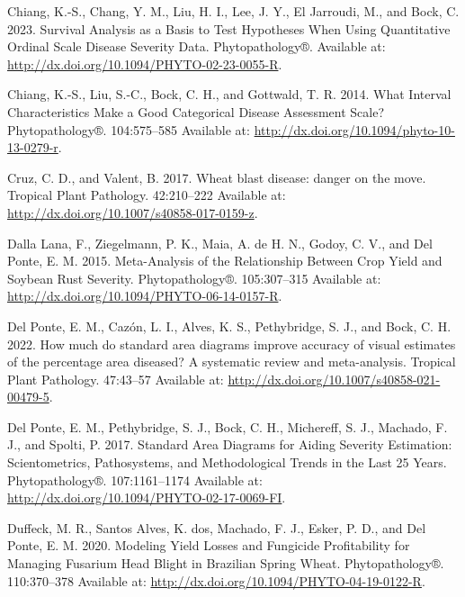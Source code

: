\documentclass[
  letterpaper,
]{book}
\newlength{\cslhangindent}
\newlength{\cslentryspacingunit} %
\newenvironment{CSLReferences}[2] %
 {%
  \setlength{\parindent}{0pt}
  \ifodd #1
  \let\oldpar\par
  \def\par{\hangindent=\cslhangindent\oldpar}
  \fi
  \setlength{\parskip}{#2\cslentryspacingunit}
 }%
 {}
\begin{document}
\begin{CSLReferences}{0}{0}
\leavevmode{}%
Chiang, K.-S., Chang, Y. M., Liu, H. I., Lee, J. Y., El Jarroudi, M.,
and Bock, C. 2023. Survival Analysis as a Basis to Test Hypotheses When
Using Quantitative Ordinal Scale Disease Severity Data. Phytopathology®.
Available at: \url{http://dx.doi.org/10.1094/PHYTO-02-23-0055-R}.

\leavevmode{}%
Chiang, K.-S., Liu, S.-C., Bock, C. H., and Gottwald, T. R. 2014. What
Interval Characteristics Make a Good Categorical Disease Assessment
Scale? Phytopathology®. 104:575--585 Available at:
\url{http://dx.doi.org/10.1094/phyto-10-13-0279-r}.

\leavevmode{}%
Cruz, C. D., and Valent, B. 2017. Wheat blast disease: danger on the
move. Tropical Plant Pathology. 42:210--222 Available at:
\url{http://dx.doi.org/10.1007/s40858-017-0159-z}.

\leavevmode{}%
Dalla Lana, F., Ziegelmann, P. K., Maia, A. de H. N., Godoy, C. V., and
Del Ponte, E. M. 2015. Meta-Analysis of the Relationship Between Crop
Yield and Soybean Rust Severity. Phytopathology®. 105:307--315 Available
at: \url{http://dx.doi.org/10.1094/PHYTO-06-14-0157-R}.

\leavevmode{}%
Del Ponte, E. M., Cazón, L. I., Alves, K. S., Pethybridge, S. J., and
Bock, C. H. 2022. How much do standard area diagrams improve accuracy of
visual estimates of the percentage area diseased? A systematic review
and meta-analysis. Tropical Plant Pathology. 47:43--57 Available at:
\url{http://dx.doi.org/10.1007/s40858-021-00479-5}.

\leavevmode{}%
Del Ponte, E. M., Pethybridge, S. J., Bock, C. H., Michereff, S. J.,
Machado, F. J., and Spolti, P. 2017. Standard Area Diagrams for Aiding
Severity Estimation: Scientometrics, Pathosystems, and Methodological
Trends in the Last 25 Years. Phytopathology®. 107:1161--1174 Available
at: \url{http://dx.doi.org/10.1094/PHYTO-02-17-0069-FI}.

\leavevmode{}%
Duffeck, M. R., Santos Alves, K. dos, Machado, F. J., Esker, P. D., and
Del Ponte, E. M. 2020. Modeling Yield Losses and Fungicide Profitability
for Managing Fusarium Head Blight in Brazilian Spring Wheat.
Phytopathology®. 110:370--378 Available at:
\url{http://dx.doi.org/10.1094/PHYTO-04-19-0122-R}.


\end{CSLReferences}
\end{document}
